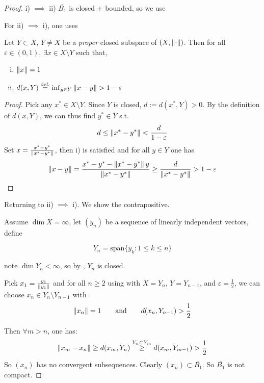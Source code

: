 \documentclass{article}
\begin{document}
\begin{proof}
    i) $\implies$ ii) $\overline{B_1}$ is closed + bounded, so we use   
    
    For ii) $\implies$ i), one uses  
\begin{lemma}[Riesz]\nextline
\label{riesz unit ball lemma}
    Let $Y \subset X$, $Y\neq X$ be a \textit{proper} closed subspace of $(X, \left\|{\cdot}\right\|)$. Then for all $\varepsilon \in (0,1)$, $\exists x \in X\setminus Y$ such that,  
    \begin{enumerate}[i)]
        \item $\left\|{x}\right\|=1$
        \item $d(x, Y) \overset{\text{def.}}{=} \inf_{y\in Y} \left\|{x-y}\right\| > 1- \varepsilon$
    \end{enumerate}
\end{lemma}  
\begin{proof}
    Pick any $x^* \in X\setminus Y$. Since $Y$ is closed, $d:=d(x^*, Y)>0$.  
    By the definition of $d(x,Y)$, we can thus find $y^* \in Y$ s.t.  
    $$
    d \leq \left\|{x^*-y^*}\right\| < \frac{d}{1-\varepsilon}
    $$  
    Set $x = \frac{x^*-y^*}{\left\|{x^*-y^*}\right\|}$, then i) is satisfied and for all $y\in Y$ one has  
    $$
    \left\|{x-y}\right\| = \frac{x^*-y^*-\left\|{x^*-y^*}\right\|y}{\left\|{x^*-y^*}\right\|} \geq \frac{d}{\left\|{x^*-y^*}\right\|} > 1-\varepsilon
    $$
\end{proof}

Returning to  ii) $\implies$ i). We show the contrapositive. 

Assume $\dim X=\infty$, let $(y_n)$ be a sequence of linearly independent vectors, define

$$Y_n = \text{span} \{y_k: 1\leq k\leq n\} $$

note $\dim Y_n < \infty$, so by , $Y_n$ is closed.  

Pick $x_1 = \frac{y_1}{\left\|{y_1}\right\|}$ and for all $n \geq 2$ using  with $X=Y_n$, $Y=Y_{n-1}$, and $\varepsilon=\frac{1}{2}$, we can choose $x_n \in Y_n \setminus Y_{n-1}$ with 
$$\left\|{x_n}\right\|=1 \qquad \text{and} \qquad d(x_n, Y_{n-1})>\frac{1}{2}$$

Then $\forall m > n$, one has:  
$$
\left\|{x_m-x_n}\right\| \geq d(x_m, Y_n) \overset{Y_n \subset Y_m}{\geq} d(x_m, Y_{m-1}) > \frac{1}{2}
$$  
So $(x_n)$ has no convergent subsequences. Clearly $(x_n) \subset \overline{B_1} $. So $\overline{B_1} $ is not compact.  
\end{proof}

\end{document}
